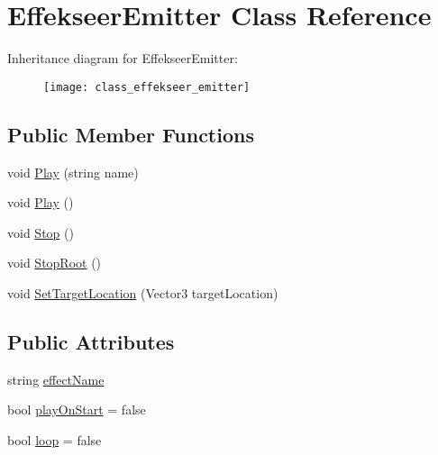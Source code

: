 \hypertarget{class_effekseer_emitter}{}\section{Effekseer\+Emitter Class Reference}
\label{class_effekseer_emitter}
Inheritance diagram for Effekseer\+Emitter\+:\begin{figure}[H]
\begin{center}
\leavevmode
\texttt{[image: class\_effekseer\_emitter]}
\end{center}
\end{figure}
\subsection*{Public Member Functions}
\begin{DoxyCompactItemize}
\item 
void \hyperlink{class_effekseer_emitter_a8ae6fd4f46274d56eee5de6b1de3ee9b}{Play} (string name)
\item 
void \hyperlink{class_effekseer_emitter_a55d07e8215485e43eaa94b7b075b2f04}{Play} ()
\item 
void \hyperlink{class_effekseer_emitter_acab7d9ae949cd0aa844ae66b2f44ad5d}{Stop} ()
\item 
void \hyperlink{class_effekseer_emitter_a6bb4daefa3632e823b684ba575043290}{Stop\+Root} ()
\item 
void \hyperlink{class_effekseer_emitter_a39366319e460cc573d4bfc40803f6787}{Set\+Target\+Location} (Vector3 target\+Location)
\end{DoxyCompactItemize}
\subsection*{Public Attributes}
\begin{DoxyCompactItemize}
\item 
string \hyperlink{class_effekseer_emitter_a3c52af81c057a2f4ea0848cb492cf208}{effect\+Name}
\item 
bool \hyperlink{class_effekseer_emitter_a8ff5bc48852b4a21e3b33b0cd0e8b65a}{play\+On\+Start} = false
\item 
bool \hyperlink{class_effekseer_emitter_a9b6a18e54c4b4a68bb9b81fc88b123bd}{loop} = false
\end{DoxyCompactItemize}
